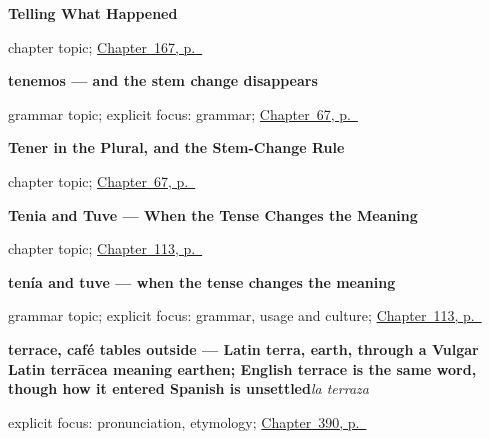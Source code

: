 \noindent\begin{minipage}[t]{\linewidth}
\raggedright
\textbf{Telling What Happened}\par
\footnotesize chapter topic; \hyperref[ch:spanish-narrating]{Chapter~167, p.~\pageref*{ch:spanish-narrating}}
\end{minipage}\par\smallskip

\noindent\begin{minipage}[t]{\linewidth}
\raggedright
\textbf{tenemos — and the stem change disappears}\par
\footnotesize grammar topic; explicit focus: grammar; \hyperref[ch:spanish-tener-plural]{Chapter~67, p.~\pageref*{ch:spanish-tener-plural}}
\end{minipage}\par\smallskip

\noindent\begin{minipage}[t]{\linewidth}
\raggedright
\textbf{Tener in the Plural, and the Stem-Change Rule}\par
\footnotesize chapter topic; \hyperref[ch:spanish-tener-plural]{Chapter~67, p.~\pageref*{ch:spanish-tener-plural}}
\end{minipage}\par\smallskip

\noindent\begin{minipage}[t]{\linewidth}
\raggedright
\textbf{Tenia and Tuve --- When the Tense Changes the Meaning}\par
\footnotesize chapter topic; \hyperref[ch:aspect-changes-meaning]{Chapter~113, p.~\pageref*{ch:aspect-changes-meaning}}
\end{minipage}\par\smallskip

\noindent\begin{minipage}[t]{\linewidth}
\raggedright
\textbf{tenía and tuve — when the tense changes the meaning}\par
\footnotesize grammar topic; explicit focus: grammar, usage and culture; \hyperref[ch:aspect-changes-meaning]{Chapter~113, p.~\pageref*{ch:aspect-changes-meaning}}
\end{minipage}\par\smallskip

\noindent\begin{minipage}[t]{\linewidth}
\raggedright
\textbf{terrace, café tables outside — Latin terra, earth, through a Vulgar Latin terrācea meaning earthen; English terrace is the same word, though how it entered Spanish is unsettled}\enspace\emph{la terraza}\par
\footnotesize explicit focus: pronunciation, etymology; \hyperref[ch:la-terraza-y-la-sala]{Chapter~390, p.~\pageref*{ch:la-terraza-y-la-sala}}
\end{minipage}\par\smallskip

